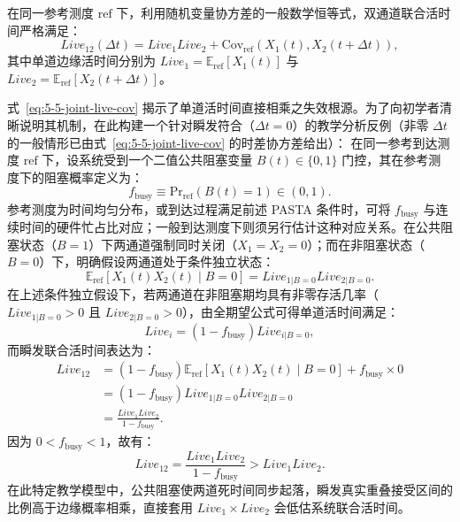 在同一参考测度 $\mathrm{ref}$ 下，利用随机变量协方差的一般数学恒等式，双通道联合活时间严格满足：
\begin{equation}\label{eq:5-5-joint-live-cov}
Live_{12}(\Delta t) = Live_1 Live_2 + \mathrm{Cov}_{\mathrm{ref}}(X_1(t), X_2(t + \Delta t)),
\end{equation}
其中单道边缘活时间分别为 $Live_1 = \mathbb{E}_{\mathrm{ref}}[X_1(t)]$ 与 $Live_2 = \mathbb{E}_{\mathrm{ref}}[X_2(t + \Delta t)]$。

式~\eqref{eq:5-5-joint-live-cov} 揭示了单道活时间直接相乘之失效根源。为了向初学者清晰说明其机制，在此构建一个针对瞬发符合（$\Delta t = 0$）的教学分析反例（非零 $\Delta t$ 的一般情形已由式~\eqref{eq:5-5-joint-live-cov} 的时差协方差给出）：
在同一参考到达测度 $\mathrm{ref}$ 下，设系统受到一个二值公共阻塞变量 $B(t) \in \{0, 1\}$ 门控，其在参考测度下的阻塞概率定义为：
\begin{equation}\label{eq:5-5-fbusy-def}
f_{\mathrm{busy}} \equiv \mathrm{Pr}_{\mathrm{ref}}(B(t) = 1) \in (0, 1).
\end{equation}
参考测度为时间均匀分布，或到达过程满足前述 PASTA 条件时，可将 $f_{\mathrm{busy}}$ 与连续时间的硬件忙占比对应；一般到达测度下则须另行估计这种对应关系。在公共阻塞状态（$B = 1$）下两通道强制同时关闭（$X_1 = X_2 = 0$）；而在非阻塞状态（$B = 0$）下，明确假设两通道处于条件独立状态：
\begin{equation}\label{eq:5-5-cond-indep}
\mathbb{E}_{\mathrm{ref}}[X_1(t) X_2(t) \mid B = 0] = Live_{1|B=0} Live_{2|B=0}.
\end{equation}
在上述条件独立假设下，若两通道在非阻塞期均具有非零存活几率（$Live_{1|B=0} > 0$ 且 $Live_{2|B=0} > 0$），由全期望公式可得单道活时间满足：
\begin{equation*}
Live_i = (1 - f_{\mathrm{busy}}) Live_{i|B=0} ,
\end{equation*}
而瞬发联合活时间表达为：
\begin{align}\label{eq:5-5-joint-cond-derived}
Live_{12} &= (1 - f_{\mathrm{busy}}) \mathbb{E}_{\mathrm{ref}}[X_1(t) X_2(t) \mid B = 0] + f_{\mathrm{busy}} \times 0 \nonumber \\
&= (1 - f_{\mathrm{busy}}) Live_{1|B=0} Live_{2|B=0} \nonumber \\
&= \frac{Live_1 Live_2}{1 - f_{\mathrm{busy}}}.
\end{align}
因为 $0 < f_{\mathrm{busy}} < 1$，故有：
\begin{equation}\label{eq:5-5-joint-bias-ineq}
Live_{12} = \frac{Live_1 Live_2}{1 - f_{\mathrm{busy}}} > Live_1 Live_2.
\end{equation}
在此特定教学模型中，公共阻塞使两道死时间同步起落，瞬发真实重叠接受区间的比例高于边缘概率相乘，直接套用 $Live_1 \times Live_2$ 会低估系统联合活时间。

